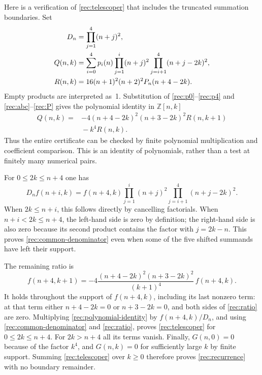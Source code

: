 \documentclass[11pt,a4paper]{article}
\theoremstyle{remark}\newtheorem{remark}[theorem]{Remark}
\begin{document}
Here is a verification of \eqref{rec:telescoper} that includes the
truncated summation boundaries.  Set
\begin{align}
 D_n&=\prod_{j=1}^{4}(n+j)^2,\notag\\
 Q(n,k)&=\sum_{i=0}^{4}p_i(n)
       \prod_{j=1}^{i}(n+j)^2
       \prod_{j=i+1}^{4}(n+j-2k)^2,\label{rec:Q}\\
 R(n,k)&=16(n+1)^2(n+2)^2P_n(n+4-2k).\label{rec:R}
\end{align}
Empty products are interpreted as~1.  Substitution of
\eqref{rec:p0}--\eqref{rec:p4} and \eqref{rec:abc}--\eqref{rec:P}
gives the polynomial identity in $\mathbb Z[n,k]$
\begin{equation}\label{rec:polynomial-identity}
 \boxed{\begin{aligned}
 Q(n,k)={}&-4(n+4-2k)^2(n+3-2k)^2R(n,k+1)\\
          &{}-k^4R(n,k).
 \end{aligned}}
\end{equation}
Thus the entire certificate can be checked by finite polynomial
multiplication and coefficient comparison.  This is an identity of
polynomials, rather than a test at finitely many numerical pairs.

For $0\leq2k\leq n+4$ one has
\begin{equation}\label{rec:common-denominator}
 D_nf(n+i,k)=f(n+4,k)
       \prod_{j=1}^{i}(n+j)^2
       \prod_{j=i+1}^{4}(n+j-2k)^2.
\end{equation}
When $2k\leq n+i$, this follows directly by cancelling factorials.
When $n+i<2k\leq n+4$, the left-hand side is zero by definition;
the right-hand side is also zero because its second product contains
the factor with $j=2k-n$.  This proves
\eqref{rec:common-denominator} even when some of the five shifted
summands have left their support.

The remaining ratio is
\begin{equation}\label{rec:ratio}
 f(n+4,k+1)=
 -4\frac{(n+4-2k)^2(n+3-2k)^2}{(k+1)^4}\,f(n+4,k).
\end{equation}
It holds throughout the support of $f(n+4,k)$, including its last
nonzero term: at that term either $n+4-2k=0$ or $n+3-2k=0$,
and both sides of \eqref{rec:ratio} are zero.  Multiplying
\eqref{rec:polynomial-identity} by $f(n+4,k)/D_n$, and using
\eqref{rec:common-denominator} and \eqref{rec:ratio}, proves
\eqref{rec:telescoper} for $0\leq2k\leq n+4$.  For $2k>n+4$
all its terms vanish.  Finally, $G(n,0)=0$ because of the factor
$k^4$, and $G(n,k)=0$ for sufficiently large $k$ by finite
support.  Summing \eqref{rec:telescoper} over $k\geq0$ therefore
proves \eqref{rec:recurrence} with no boundary remainder.
\end{document}
